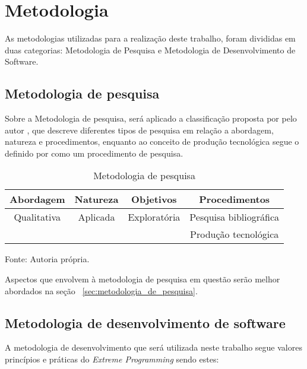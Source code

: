 \section{Metodologia}

 As metodologias utilizadas para a realização deste trabalho, foram divididas em duas categorias: Metodologia de Pesquisa e Metodologia de Desenvolvimento de Software.

\subsection{Metodologia de pesquisa}

Sobre a Metodologia de pesquisa, será aplicado a classificação proposta por pelo autor \cite{Gerhardt2009}, que descreve diferentes tipos de pesquisa em relação a abordagem, natureza e procedimentos, enquanto ao conceito de produção tecnológica segue o definido por \cite{Serzedello_Tomael_2011} como um procedimento de pesquisa.

\begin{table}[ht]
    \centering
    
    \begin{tabular}{|c|c|c|c|}
    \hline
    \textbf{Abordagem} & \textbf{Natureza} & \textbf{Objetivos} & \textbf{Procedimentos} \\ \hline
    Qualitativa        & Aplicada          & Exploratória       & Pesquisa bibliográfica \\ 
                    &                   &                    & Produção tecnológica   \\ \hline
    \end{tabular}
    \caption{Metodologia de pesquisa}
    Fonte: Autoria própria.
    
\end{table}

Aspectos que envolvem à metodologia de pesquisa em questão serão melhor abordados na seção ~\ref{sec:metodologia_de_pesquisa}.

\subsection{Metodologia de desenvolvimento de software}

A metodologia de desenvolvimento que será utilizada neste trabalho segue valores princípios e práticas do  \emph{Extreme Programming} \cite{beckKent2004} sendo estes:


